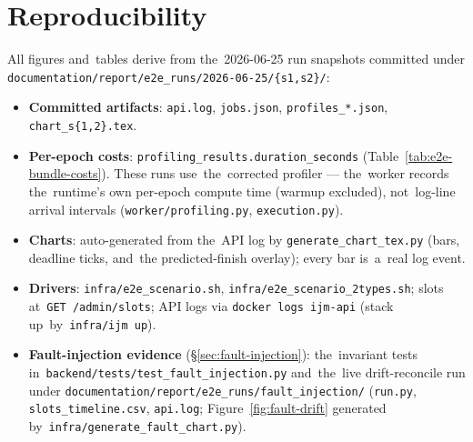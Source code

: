 \section{Reproducibility}

All figures and~tables derive from the~2026-06-25 run snapshots committed
under \texttt{documentation/report/e2e\_runs/2026-06-25/\{s1,s2\}/}:

\begin{itemize}[leftmargin=*,itemsep=1pt,topsep=2pt]
  \item \textbf{Committed artifacts}: \texttt{api.log}, \texttt{jobs.json},
    \texttt{profiles\_*.json}, \texttt{chart\_s\{1,2\}.tex}.
  \item \textbf{Per-epoch costs}: \texttt{profiling\_results.duration\_seconds}
    (Table~\ref{tab:e2e-bundle-costs}).  These runs use~the~corrected
    profiler --- the~worker records the~runtime's own per-epoch compute time
    (warmup excluded), not~log-line arrival intervals (\texttt{worker/profiling.py},
    \texttt{execution.py}).
  \item \textbf{Charts}: auto-generated from the~API log by
    \texttt{generate\_chart\_tex.py} (bars, deadline ticks, and~the
    predicted-finish overlay); every bar is~a~real log event.
  \item \textbf{Drivers}: \texttt{infra/e2e\_scenario.sh},
    \texttt{infra/e2e\_scenario\_2types.sh}; slots at~\texttt{GET /admin/slots};
    API logs via \texttt{docker logs ijm-api} (stack up~by~\texttt{infra/ijm up}).
  \item \textbf{Fault-injection evidence} (\S\ref{sec:fault-injection}):
    the~invariant tests in~\texttt{backend/tests/test\_fault\_injection.py}
    and~the~live drift-reconcile run under
    \texttt{documentation/report/e2e\_runs/fault\_injection/}
    (\texttt{run.py}, \texttt{slots\_timeline.csv}, \texttt{api.log};
    Figure~\ref{fig:fault-drift} generated by~\texttt{infra/generate\_fault\_chart.py}).
\end{itemize}

